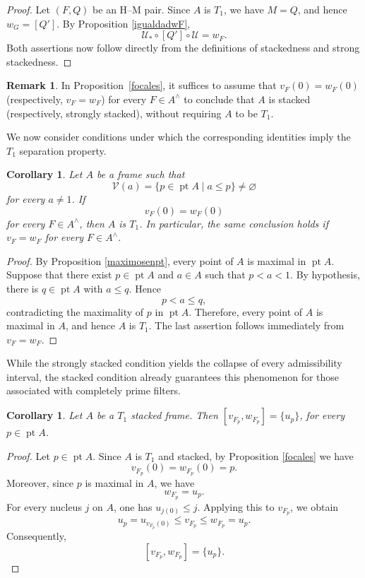 \documentclass[11pt]{amsart}
\DeclareMathOperator{\pt}{pt}
\theoremstyle{plain}
\newtheorem{cor}[thm]{Corollary}
\theoremstyle{definition}
\newtheorem{obs}[thm]{Remark}
\begin{document}
\begin{proof}
Let $(F,Q)$ be an H--M pair. Since $A$ is $T_1$,
we have $M=Q$, and hence $w_G=[Q']$.
By Proposition \ref{igualdadwF},
\[
\mathcal U_*\circ [Q']\circ \mathcal U=w_F.
\]
Both assertions now follow directly from the
definitions of stackedness and strong stackedness.
\end{proof}

\begin{obs}\label{rem:stacked-equality}
In Proposition~\ref{focales}, it suffices to assume that
$v_F(0)=w_F(0)$ (respectively, $v_F=w_F$) for every
$F\in A^\wedge$ to conclude that $A$ is stacked
(respectively, strongly stacked), without requiring
$A$ to be $T_1$.
\end{obs}

We now consider conditions under
which the corresponding identities imply the
$T_1$ separation property.

\begin{cor}\label{ImplicacionT1}
Let $A$ be a frame such that
\[
\mathcal{V}(a)=\{p\in\pt A\mid a\leq p\}
\neq\varnothing
\]
for every $a\neq 1$. If
\[
v_F(0)=w_F(0)
\]
for every $F\in A^\wedge$, then $A$ is $T_1$.
In particular, the same conclusion holds if
$v_F=w_F$ for every $F\in A^\wedge$.
\end{cor}

\begin{proof}
By Proposition \ref{maximosenpt}, every point of $A$ is
maximal in $\pt A$. Suppose that there exist
$p\in\pt A$ and $a\in A$ such that
$p<a<1$. By hypothesis, there is
$q\in\pt A$ with $a\leq q$. Hence
\[
p<a\leq q,
\]
contradicting the maximality of $p$ in
$\pt A$. Therefore, every point of $A$
is maximal in $A$, and hence $A$ is $T_1$.
The last assertion follows immediately from
$v_F=w_F$.
\end{proof}

While the strongly stacked condition yields the collapse of every
admissibility interval, the stacked condition already guarantees this
phenomenon for those associated with completely prime filters.

\begin{cor}\label{Igualdadnucleos}
Let $A$ be a $T_1$ stacked frame. Then $[v_{F_p},w_{F_p}]=\{u_p\}$,
for every $p\in\pt A$.
\end{cor}

\begin{proof}
Let $p\in\pt A$. Since $A$ is $T_1$ and stacked,
by Proposition \ref{focales} we have
\[
v_{F_p}(0)=w_{F_p}(0)=p.
\]
Moreover, since $p$ is maximal in $A$, we have
\[
w_{F_p}=u_p.
\]
For every nucleus $j$ on $A$, one has
$u_{j(0)}\leq j$. Applying this to $v_{F_p}$,
we obtain
\[
u_p=u_{v_{F_p}(0)}
\leq v_{F_p}\leq w_{F_p}=u_p.
\]
Consequently,
\[
[v_{F_p},w_{F_p}]=\{u_p\}.
\]
\end{proof}
\end{document}
